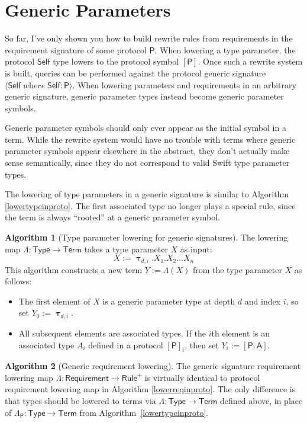 \documentclass[headsepline,bibliography=totoc]{scrreport}
\newcommand{\namesym}[1]{\mathsf{#1}}
\newcommand{\genericparam}[1]{\bm{\mathsf{#1}}}
\newcommand{\proto}[1]{\bm{\mathsf{#1}}}
\newcommand{\protosym}[1]{[\proto{#1}]}
\newcommand{\gensig}[2]{\langle #1\;\textit{where}\;#2\rangle}
\newcommand{\genericsym}[2]{\bm{\uptau}_{#1,#2}}
\newcommand{\assocsym}[2]{[\proto{#1}\colon\namesym{#2}]}
\theoremstyle{definition}
\theoremstyle{definition}
\theoremstyle{definition}
\newtheorem{algorithm}{Algorithm}[chapter]
\begin{document}
\section{Generic Parameters}\label{genericparamsym}
So far, I've only shown you how to build rewrite rules from requirements in the requirement signature of some protocol $\proto{P}$. When lowering a type parameter, the protocol $\genericparam{Self}$ type lowers to the protocol symbol $\protosym{P}$. Once such a rewrite system is built, queries can be performed against the protocol generic signature $\gensig{\genericparam{Self}}{\genericparam{Self}\colon\proto{P}}$. When lowering parameters and requirements in an arbitrary generic signature, generic parameter types instead become generic parameter symbols.

Generic parameter symbols should only ever appear as the initial symbol in a term. While the rewrite system would have no trouble with terms where generic parameter symbols appear elsewhere in the abstract, they don't actually make sense semantically, since they do not correspond to valid Swift type parameter types.

The lowering of type parameters in a generic signature is similar to Algorithm \ref{lowertypeinproto}. The first associated type no longer plays a special rule, since the term is always ``rooted'' at a generic parameter symbol.

\begin{algorithm}[Type parameter lowering for generic signatures]\label{lowertypeinsig}
The lowering map $\Lambda\colon\namesym{Type}\rightarrow\namesym{Term}$ takes a type parameter $X$ as input:
\[X:=\genericsym{d}{i}.X_1.X_2\ldots X_n\]
This algorithm constructs a new term $Y:=\Lambda(X)$ from the type parameter $X$ as follows:
\begin{itemize}
\item
The first element of $X$ is a generic parameter type at depth $d$ and index $i$, so set $Y_0:=\genericsym{d}{i}$.
\item
All subsequent elements are associated types. If the $i$th element is an associated type $A_i$ defined in a protocol $\protosym{P}_i$, then set $Y_i:=\assocsym{P}{A}$.
\end{itemize}
\end{algorithm}

\begin{algorithm}[Generic requirement lowering]
The generic signature requirement lowering map $\Lambda\colon \namesym{Requirement}\rightarrow\namesym{Rule}^+$ is virtually identical to protocol requirement lowering map in Algorithm \ref{lowerreqinproto}. The only difference is that types should be lowered to terms via $\Lambda\colon\namesym{Type}\rightarrow\namesym{Term}$ defined above, in place of $\Lambda_{\proto{P}}\colon\namesym{Type}\rightarrow\namesym{Term}$ from Algorithm~\ref{lowertypeinproto}.
\end{algorithm}
\end{document}
